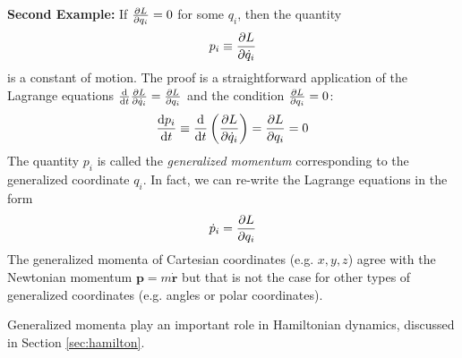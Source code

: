 \documentclass[11pt, a4paper]{article}
\newcommand{\bdot}[1]{\dot{\bm{#1}}} %
\begin{document}
\begin{itemize}
	\textbf{Second Example:} If $ \pdv{L}{q_i} = 0 $ for some $ q_i $, then the quantity
	\begin{equation*}
		p_i \equiv \pdv{L}{\dot{q}_i}
	\end{equation*}
	is a constant of motion. The proof is a straightforward application of the Lagrange equations $ \dv{}{t} \pdv{L}{\dot{q}_i} = \pdv{L}{q_i} $ and the condition $ \pdv{L}{q_i} = 0 $:
	\begin{equation*}
		\dv{p_i}{t} \equiv \dv{}{t} \left(\pdv{L}{\dot{q}_i}\right) = \pdv{L}{q_i} = 0 
	\end{equation*}
	The quantity $ p_{i} $ is called the \textit{generalized momentum} corresponding to the generalized coordinate $ q_{i} $. In fact, we can re-write the Lagrange equations in the form
	\begin{equation*}
		\dot{p}_{i} = \pdv{L}{q_{i}}
	\end{equation*}
	The generalized momenta of Cartesian coordinates (e.g. $ x, y, z $) agree with the Newtonian momentum $ \bm{p} = m \bdot{r} $ but that is not the case for other types of generalized coordinates (e.g. angles or polar coordinates). 
	
	Generalized momenta play an important role in Hamiltonian dynamics, discussed in Section \ref{sec:hamilton}.
	 
\end{itemize}
\end{document}
